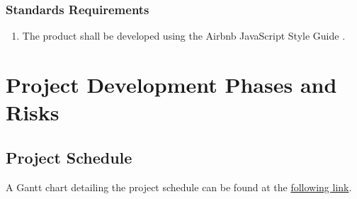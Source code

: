 \documentclass[]{article}
\begin{document}
\subsubsection{Standards Requirements}
\label{ssub:standards_requirements}
\begin{enumerate}[{LR}1., leftmargin=2\parindent]
	\item The product shall be developed using the Airbnb JavaScript Style Guide \cite{AirbnbStyle}.
\end{enumerate}

\section{Project Development Phases and Risks}
\subsection{Project Schedule}
A Gantt chart detailing the project schedule can be found at the \href{https://gitlab.cas.mcmaster.ca/celsj/3xa3-group2-chess/-/tree/master/ProjectSchedule}{following link}.
\end{document}
